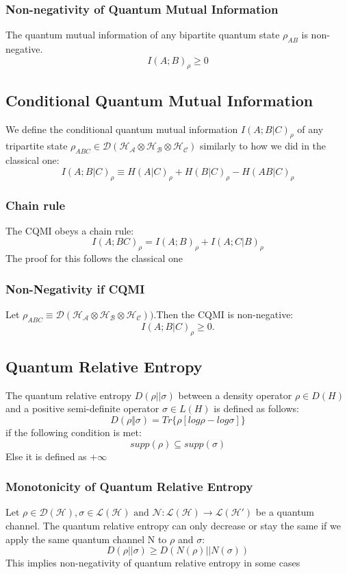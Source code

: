 \subsubsection{Non-negativity of Quantum Mutual Information}
The quantum mutual information of any bipartite quantum state $\rho_{AB}$ is non-negative.
\[
I(A;B)_\rho \geq 0
\]


\subsection{Conditional Quantum Mutual Information}
We define the conditional quantum mutual information $I(A;B|C)_\rho$ of any tripartite state $\rho_{ABC} \in \mathcal{D}(\mathcal{H_A} \otimes \mathcal{H_B} \otimes \mathcal{H_C})$ similarly to how we did in the classical one:
\[
I(A;B|C)_\rho \equiv H(A|C)_\rho + H(B|C)_\rho - H(AB|C)_\rho
\]

\subsubsection{Chain rule}
The CQMI obeys a chain rule:
\[
I(A;BC)_\rho = I(A;B)_\rho + I(A;C|B)_\rho
\]
The proof for this follows the classical one


\subsubsection{Non-Negativity if CQMI}
Let $\rho _{ABC} \equiv \mathcal{D}(\mathcal{H_A} \otimes \mathcal{H_B} \otimes \mathcal{H_C}))$.Then the CQMI is non-negative:
\[
I(A;B|C)_\rho \geq 0.
\]

\subsection{Quantum Relative Entropy}
The quantum relative entropy $D(\rho||\sigma)$ between a density operator $\rho \in D(H)$ and a positive semi-definite operator $\sigma \in L(H)$ is defined as follows:
\[
D(\rho \Vert \sigma) = Tr\{\rho[log\rho - log\sigma]\}
\]
if the following condition is met:
\[
supp(\rho) \subseteq supp(\sigma)
\]
Else it is defined as +$\infty$
\newline
\newline

\subsubsection{Monotonicity of Quantum Relative Entropy}
Let $\rho \in \mathcal{D}(\mathcal{H}), \sigma \in \mathcal{L}(\mathcal{H}) \text{ and } \mathcal{N}:\mathcal{L}(\mathcal{H}) \rightarrow \mathcal{L}(\mathcal{H}\prime)$ be a quantum channel. The quantum relative entropy can only decrease or stay the same if we apply the same quantum channel N to $\rho$ and $\sigma$:
\[
D(\rho||\sigma) \geq D(N(\rho)||N(\sigma))
\]
This implies non-negativity of quantum relative entropy in some cases

